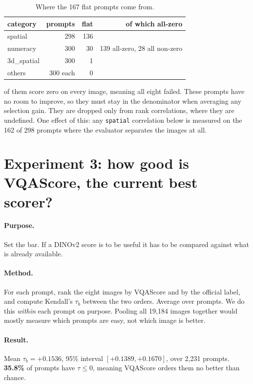 \documentclass[11pt]{article}
\begin{document}
\begin{table}[h]
\centering
\caption{Where the 167 flat prompts come from.}
\begin{tabular}{@{}lrrr@{}}
\toprule
category & prompts & flat & of which all-zero \\
\midrule
spatial     & 298 & 136 & \multirow{3}{*}{139 all-zero, 28 all non-zero} \\
numeracy    & 300 &  30 & \\
3d\_spatial & 300 &   1 & \\
others      & 300 each & 0 & \\
\bottomrule
\end{tabular}
\end{table}

 of them score zero on every image, meaning all eight failed. These prompts have no room to
improve, so they must stay in the denominator when averaging any selection gain. They are dropped
only from rank correlations, where they are undefined. One effect of this: any \texttt{spatial}
correlation below is measured on the 162 of 298 prompts where the evaluator separates the images at
all.

\section{Experiment 3: how good is VQAScore, the current best scorer?}

\paragraph{Purpose.} Set the bar. If a DINOv2 score is to be useful it has to be compared against
what is already available.

\paragraph{Method.} For each prompt, rank the eight images by VQAScore and by the official label, and
compute Kendall's $\tau_b$ between the two orders. Average over prompts. We do this \emph{within}
each prompt on purpose. Pooling all 19{,}184 images together would mostly measure which prompts are
easy, not which image is better.

\paragraph{Result.} Mean $\tau_b = \mathbf{+0.1536}$, 95\% interval $[+0.1389, +0.1670]$, over 2{,}231
prompts. \textbf{35.8\%} of prompts have $\tau \le 0$, meaning VQAScore orders them no better than
chance.
\end{document}
